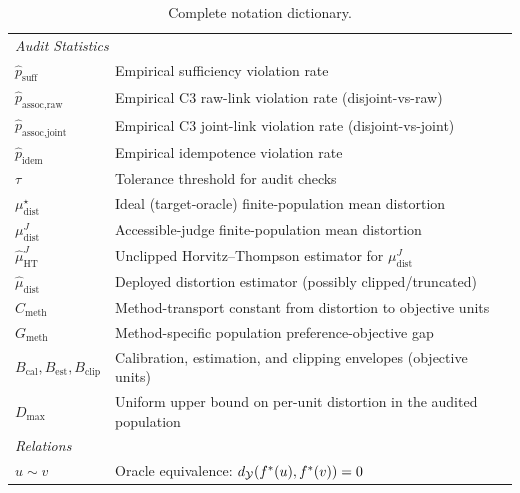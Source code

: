 \begin{table}[h]
\begin{tabular}{ll}
\midrule
\multicolumn{2}{l}{\textit{Audit Statistics}} \\
$\hat{p}_{\text{suff}}$ & Empirical sufficiency violation rate \\
$\hat{p}_{\text{assoc,raw}}$ & Empirical C3 raw-link violation rate (disjoint-vs-raw) \\
$\hat{p}_{\text{assoc,joint}}$ & Empirical C3 joint-link violation rate (disjoint-vs-joint) \\
$\hat{p}_{\text{idem}}$ & Empirical idempotence violation rate \\
$\tau$ & Tolerance threshold for audit checks \\
$\mu_{\mathrm{dist}}^{\star}$ & Ideal (target-oracle) finite-population mean distortion \\
$\mu_{\mathrm{dist}}^{J}$ & Accessible-judge finite-population mean distortion \\
$\hat{\mu}_{\mathrm{HT}}^{J}$ & Unclipped Horvitz--Thompson estimator for $\mu_{\mathrm{dist}}^{J}$ \\
$\hat{\mu}_{\mathrm{dist}}$ & Deployed distortion estimator (possibly clipped/truncated) \\
$C_{\mathrm{meth}}$ & Method-transport constant from distortion to objective units \\
$G_{\mathrm{meth}}$ & Method-specific population preference-objective gap \\
$B_{\mathrm{cal}}, B_{\mathrm{est}}, B_{\mathrm{clip}}$ & Calibration, estimation, and clipping envelopes (objective units) \\
$D_{\max}$ & Uniform upper bound on per-unit distortion in the audited population \\
\midrule
\multicolumn{2}{l}{\textit{Relations}} \\
$u \sim v$ & Oracle equivalence: $d_{\mathcal{Y}}(f^\ast(u), f^\ast(v)) = 0$ \\
\bottomrule
\end{tabular}
\caption{Complete notation dictionary.}
\end{table}
